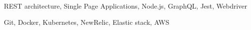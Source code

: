 \documentclass[9pt]{developercv} %
\begin{document}
\hfill
\begin{minipage}[t]{0.3\textwidth}
	\vspace{-\baselineskip} %
	
	
	REST architecture, Single Page Applications, Node.js, GraphQL, Jest, Webdriver
\end{minipage}
\hfill
\begin{minipage}[t]{0.3\textwidth}
	\vspace{-\baselineskip} %
	
	
	Git,  Docker, Kubernetes, NewRelic, Elastic stack, AWS
\end{minipage}
\\ \\ 


\end{document}
